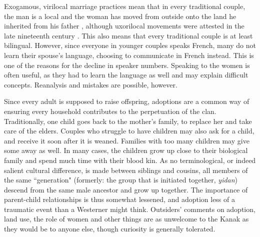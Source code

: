 Exogamous, virilocal marriage practices mean that in every traditional couple, the man is a local and the woman has moved from outside onto the land he inherited from his father \parencite[321]{salomon_hommes_2000}, although uxorilocal movements were attested in the late nineteenth century \parencite[89]{guiart_laire_1992}. This also means that every traditional couple is at least bilingual. However, since everyone in younger couples speaks French, many do not learn their spouse's language, choosing to communicate in French instead. This is one of the reasons for the decline in speaker numbers. Speaking to the women is often useful, as they had to learn the language as well and may explain difficult concepts. Reanalysis and mistakes are possible, however.

Since every adult is supposed to raise offspring, adoptions are a common way of ensuring every household contributes to the perpetuation of the clan. Traditionally, one child goes back to the mother's family, to replace her and take care of the elders. Couples who struggle to have children may also ask for a child, and receive it soon after it is weaned. Families with too many children may give some away as well. In many cases, the children grow up close to their biological family and spend much time with their blood kin. As no terminological, or indeed salient cultural difference, is made between siblings and cousins, all members of the same ``generation" (formerly: the group that is initiated together, \textit{yidan}) descend from the same male ancestor and grow up together. The importance of parent-child relationships is thus somewhat lessened, and adoption less of a traumatic event than a Westerner might think. Outsiders' comments on adoption, land use, the role of women and other things are as unwelcome to the Kanak as they would be to anyone else, though curiosity is generally tolerated.

